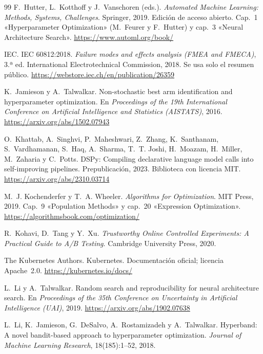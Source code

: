\begin{thebibliography}{99}
F.~Hutter, L.~Kotthoff y J.~Vanschoren (eds.).
\newblock \emph{Automated Machine Learning: Methods, Systems, Challenges}.
\newblock Springer, 2019. Edición de acceso abierto. Cap.~1 «Hyperparameter Optimization» (M.~Feurer y F.~Hutter) y cap.~3 «Neural Architecture Search».
\newblock \url{https://www.automl.org/book/}

IEC.
\newblock IEC 60812:2018. \emph{Failure modes and effects analysis (FMEA and FMECA)}, 3.ª ed.
\newblock International Electrotechnical Commission, 2018. Se usa solo el resumen público.
\newblock \url{https://webstore.iec.ch/en/publication/26359}

K.~Jamieson y A.~Talwalkar.
\newblock Non-stochastic best arm identification and hyperparameter optimization.
\newblock En \emph{Proceedings of the 19th International Conference on Artificial Intelligence and Statistics (AISTATS)}, 2016.
\newblock \url{https://arxiv.org/abs/1502.07943}

O.~Khattab, A.~Singhvi, P.~Maheshwari, Z.~Zhang, K.~Santhanam, S.~Vardhamanan, S.~Haq, A.~Sharma, T.~T. Joshi, H.~Moazam, H.~Miller, M.~Zaharia y C.~Potts.
\newblock DSPy: Compiling declarative language model calls into self-improving pipelines.
\newblock Prepublicación, 2023. Biblioteca con licencia MIT.
\newblock \url{https://arxiv.org/abs/2310.03714}

M.~J. Kochenderfer y T.~A. Wheeler.
\newblock \emph{Algorithms for Optimization}.
\newblock MIT Press, 2019. Cap.~9 «Population Methods» y cap.~20 «Expression Optimization».
\newblock \url{https://algorithmsbook.com/optimization/}

R.~Kohavi, D.~Tang y Y.~Xu.
\newblock \emph{Trustworthy Online Controlled Experiments: A Practical Guide to A/B Testing}.
\newblock Cambridge University Press, 2020.

The Kubernetes Authors.
\newblock Kubernetes. Documentación oficial; licencia Apache~2.0.
\newblock \url{https://kubernetes.io/docs/}

L.~Li y A.~Talwalkar.
\newblock Random search and reproducibility for neural architecture search.
\newblock En \emph{Proceedings of the 35th Conference on Uncertainty in Artificial Intelligence (UAI)}, 2019.
\newblock \url{https://arxiv.org/abs/1902.07638}

L.~Li, K.~Jamieson, G.~DeSalvo, A.~Rostamizadeh y A.~Talwalkar.
\newblock Hyperband: A novel bandit-based approach to hyperparameter optimization.
\newblock \emph{Journal of Machine Learning Research}, 18(185):1--52, 2018.


\end{thebibliography}
